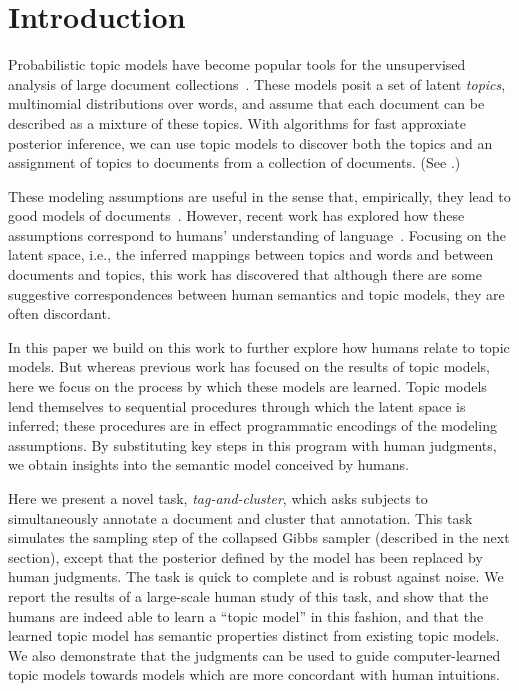 \section{Introduction}
Probabilistic topic models have become popular tools for the
unsupervised analysis of large document
collections~\cite{deerwester-90,griffiths02probabilistic,blei-09}.
These models posit a set of latent \emph{topics}, multinomial
distributions over words, and assume that each document can be
described as a mixture of these topics.  With algorithms for fast
approxiate posterior inference, we can use topic models to discover
both the topics and an assignment of topics to documents from a
collection of documents.  (See .)

These modeling assumptions are useful in the sense that, empirically,
they lead to good models of documents~\cite{wallach-09}.  However,
recent work has explored how these assumptions correspond to humans'
understanding of language~\cite{Chang:2009fk,griffiths-06,mei-07}.  Focusing
on the latent space, i.e., the inferred mappings between topics and
words and between documents and topics, this work has discovered that
although there are some suggestive correspondences between human
semantics and topic models, they are often discordant.

In this paper we build on this work to further explore how humans
relate to topic models.  But whereas previous work has focused on
the results of topic models, here we focus on the process by which
these models are learned.  Topic models lend themselves to sequential
procedures through which the latent space is inferred; these
procedures are in effect programmatic encodings of the modeling
assumptions.  By substituting key steps in this program with human
judgments, we obtain insights into the semantic model conceived by
humans.

Here we present a novel task, \emph{tag-and-cluster}, which asks
subjects to simultaneously annotate a document and cluster that
annotation.  This task simulates the sampling step of the collapsed
Gibbs sampler (described in the next section), except that the
posterior defined by the model has been replaced by human judgments.
The task is quick to complete and is robust against noise.  We report
the results of a large-scale human study of this task, and show that
the humans are indeed able to learn a ``topic model'' in this fashion,
and that the learned topic model has semantic properties distinct from
existing topic models.  We also demonstrate that the judgments can be
used to guide computer-learned topic models towards models which are
more concordant with human intuitions.
